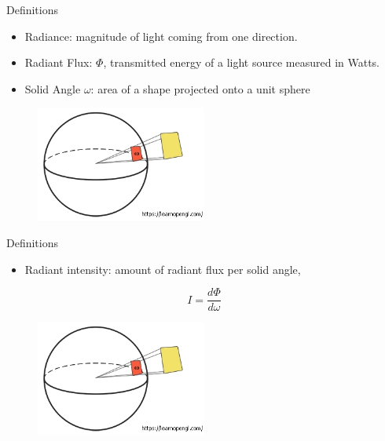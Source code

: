 \documentclass[]{beamer}
\begin{document}

\begin{frame}


  \textcolor{mypink1}{Definitions} 
\vspace{5mm}
\pause


\begin{itemize}
  \item Radiance: magnitude of light coming from one direction.\pause
  \item Radiant Flux: $\Phi$, transmitted energy of a light source measured in Watts.\pause
  \item Solid Angle $\omega$: \pause  area of a shape projected onto a unit sphere
\end{itemize}



\begin{figure}[h!]
  \begin{center}
    \includegraphics[height=1.5in]{images/18.jpg}
  \end{center}
\end{figure}

\end{frame}




\begin{frame}


  \textcolor{mypink1}{Definitions} 
\vspace{5mm}
\pause


\begin{itemize}
  \item Radiant intensity: amount of radiant flux per solid angle, 
\end{itemize}

\begin{equation*}
  I=\frac{d\Phi}{d \omega}
\end{equation*}

\begin{figure}[h!]
  \begin{center}
    \includegraphics[height=1.5in]{images/18.jpg}
  \end{center}
\end{figure}

\end{frame}
\end{document}

